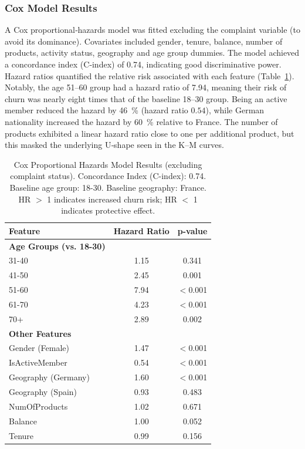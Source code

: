 \documentclass[12pt]{article}
\begin{document}
\subsubsection{Cox Model Results}
A Cox proportional‑hazards model was fitted excluding the complaint variable (to avoid its dominance).  Covariates included gender, tenure, balance, number of products, activity status, geography and age group dummies.  The model achieved a concordance index (C‑index) of 0.74, indicating good discriminative power.  Hazard ratios quantified the relative risk associated with each feature (Table~\ref{tab:cox_results}).  Notably, the age 51–60 group had a hazard ratio of 7.94, meaning their risk of churn was nearly eight times that of the baseline 18–30 group.  Being an active member reduced the hazard by 46~\% (hazard ratio \(0.54\)), while German nationality increased the hazard by 60~\% relative to France.  The number of products exhibited a linear hazard ratio close to one per additional product, but this masked the underlying U‑shape seen in the K–M curves.

\begin{table}[H]
\centering
\small
\caption{Cox Proportional Hazards Model Results (excluding complaint status). Concordance Index (C-index): 0.74. Baseline age group: 18-30. Baseline geography: France. HR $>$ 1 indicates increased churn risk; HR $<$ 1 indicates protective effect.}
\label{tab:cox_results}
\begin{tabular}{lcc}
\toprule
\textbf{Feature} & \textbf{Hazard Ratio} & \textbf{p-value} \\
\midrule
\textbf{Age Groups (vs. 18-30)} & & \\
\phantom{---} 31-40 & 1.15 & 0.341 \\
\phantom{---} 41-50 & 2.45 & 0.001 \\
\phantom{---} 51-60 & 7.94 & $<$0.001 \\
\phantom{---} 61-70 & 4.23 & $<$0.001 \\
\phantom{---} 70+ & 2.89 & 0.002 \\
\midrule
\textbf{Other Features} & & \\
\phantom{---} Gender (Female) & 1.47 & $<$0.001 \\
\phantom{---} IsActiveMember & 0.54 & $<$0.001 \\
\phantom{---} Geography (Germany) & 1.60 & $<$0.001 \\
\phantom{---} Geography (Spain) & 0.93 & 0.483 \\
\phantom{---} NumOfProducts & 1.02 & 0.671 \\
\phantom{---} Balance & 1.00 & 0.052 \\
\phantom{---} Tenure & 0.99 & 0.156 \\
\bottomrule
\end{tabular}
\end{table}
\end{document}
